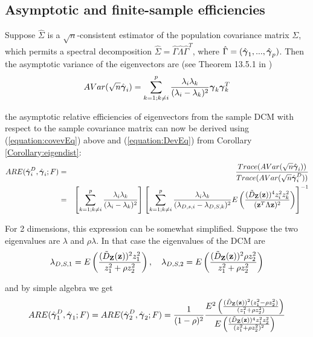 \documentclass[fleqn,12pt]{article}
\begin{document}
\subsection{Asymptotic and finite-sample efficiencies}
Suppose $\hat\Sigma$ is a $\sqrt n$-consistent estimator of the population covariance matrix $\Sigma$, which permits a spectral decomposition $ \hat\Sigma = \hat\Gamma \hat\Lambda \hat\Gamma^T $, where $\hat\Gamma = (\hat{{\boldsymbol{\gamma}}}_1,...,\hat{{\boldsymbol{\gamma}}}_p)$. Then the asymptotic variance of the eigenvectors are (see Theorem 13.5.1 in \cite{anderson})
\begin{equation} \label{equation:covevEq}
AVar(\sqrt n\hat {{\boldsymbol{\gamma}}}_i) = \sum_{k=1; k \neq i}^p \frac{\lambda_i \lambda_k}{(\lambda_i - \lambda_k)^2} {\boldsymbol{\gamma}}_k {\boldsymbol{\gamma}}_k^T
\end{equation}

the asymptotic relative efficiencies of eigenvectors from the sample DCM with respect to the sample covariance matrix can now be derived using (\ref{equation:covevEq}) above and (\ref{equation:DevEq}) from Corollary \ref{Corollary:eigendist}:
\begin{eqnarray*}
ARE(\hat{{\boldsymbol{\gamma}}}^D_i, \hat{{\boldsymbol{\gamma}}}_i; F) &=& \frac{Trace( AVar(\sqrt n\hat {{\boldsymbol{\gamma}}}_i))}{Trace( AVar(\sqrt n\hat {{\boldsymbol{\gamma}}}^D_i))}\\
&=& \left[\sum_{k=1; k \neq i}^p \frac{\lambda_i \lambda_k}{(\lambda_i - \lambda_k)^2} \right] \left[ \sum_{k=1; k \neq i}^p \frac{\lambda_i \lambda_k }{(\lambda_{D,s,i} - \lambda_{D,S,k})^2} E \left( \frac{(\tilde D_{\mathbf{Z}} ({\bf{z}}))^4 z_i^2 z_k^2}{({\bf{z}}^T \Lambda {\bf{z}})^2} \right) \right]^{-1}
\end{eqnarray*}

For 2 dimensions, this expression can be somewhat simplified. Suppose the two eigenvalues are $\lambda$ and $\rho\lambda$. In that case the eigenvalues of the DCM are
$$ \lambda_{D,S,1} = E \left( \frac{(\tilde D_{\mathbf{Z}}({\bf{z}}))^2 z_1^2}{z_1^2 + \rho z_2^2} \right), \quad
\lambda_{D,S,2} = E \left( \frac{(\tilde D_{\mathbf{Z}}({\bf{z}}))^2 \rho z_2^2}{z_1^2 + \rho z_2^2} \right) $$

and by simple algebra we get
$$ ARE(\hat{{\boldsymbol{\gamma}}}^D_1, \hat{{\boldsymbol{\gamma}}}_1; F) = ARE(\hat{{\boldsymbol{\gamma}}}^D_2, \hat{{\boldsymbol{\gamma}}}_2; F) = \frac{1}{(1-\rho)^2} \frac{E^2 \left( \frac{(\tilde D_{\mathbf{Z}}({\bf{z}}))^2 (z_1^2 - \rho z_2^2)}{(z_1^2 + \rho z_2^2)} \right)}{E \left( \frac{(\tilde D_{\mathbf{Z}}({\bf{z}}))^4 z_1^2z_2^2}{(z_1^2 + \rho z_2^2)^2}\right)} $$
\end{document}
